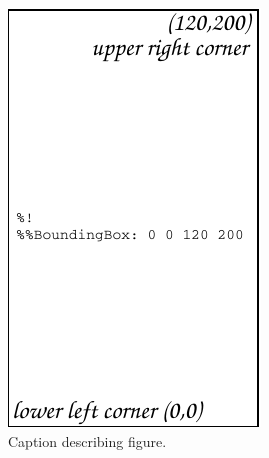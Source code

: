 \documentclass{iucr}              %
\begin{document}
\begin{figure}
\caption{Caption describing figure.}
\includegraphics{fig1}
\end{figure}
\end{document}
